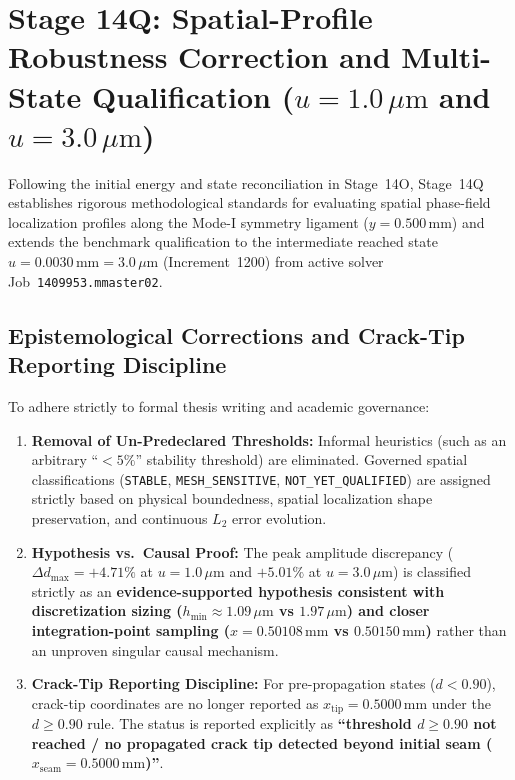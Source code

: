 \section{Stage 14Q: Spatial-Profile Robustness Correction and Multi-State Qualification (\texorpdfstring{$u = 1.0\,\mu\mathrm{m}$}{u = 1.0 um} and \texorpdfstring{$u = 3.0\,\mu\mathrm{m}$}{u = 3.0 um})}
\label{sec:stage14q_profile_robustness}

Following the initial energy and state reconciliation in Stage~14O, Stage~14Q establishes rigorous methodological standards for evaluating spatial phase-field localization profiles along the Mode-I symmetry ligament ($y = 0.500\,\mathrm{mm}$) and extends the benchmark qualification to the intermediate reached state $u = 0.0030\,\mathrm{mm} = 3.0\,\mu\mathrm{m}$ (Increment~1200) from active solver Job~\texttt{1409953.mmaster02}.

\subsection{Epistemological Corrections and Crack-Tip Reporting Discipline}
\label{subsec:stage14q_epistemology}

To adhere strictly to formal thesis writing and academic governance:
\begin{enumerate}
    \item \textbf{Removal of Un-Predeclared Thresholds:} Informal heuristics (such as an arbitrary ``$< 5\%$'' stability threshold) are eliminated. Governed spatial classifications (\texttt{STABLE}, \texttt{MESH\_SENSITIVE}, \texttt{NOT\_YET\_QUALIFIED}) are assigned strictly based on physical boundedness, spatial localization shape preservation, and continuous $L_2$ error evolution.
    \item \textbf{Hypothesis vs.\ Causal Proof:} The peak amplitude discrepancy ($\Delta d_{\max} = +4.71\%$ at $u = 1.0\,\mu\mathrm{m}$ and $+5.01\%$ at $u = 3.0\,\mu\mathrm{m}$) is classified strictly as an \textbf{evidence-supported hypothesis consistent with discretization sizing ($h_{\min} \approx 1.09\,\mu\mathrm{m}$ vs $1.97\,\mu\mathrm{m}$) and closer integration-point sampling ($x = 0.50108\,\mathrm{mm}$ vs $0.50150\,\mathrm{mm}$)} rather than an unproven singular causal mechanism.
    \item \textbf{Crack-Tip Reporting Discipline:} For pre-propagation states ($d < 0.90$), crack-tip coordinates are no longer reported as $x_{\mathrm{tip}} = 0.5000\,\mathrm{mm}$ under the $d \ge 0.90$ rule. The status is reported explicitly as \textbf{``threshold $d \ge 0.90$ not reached / no propagated crack tip detected beyond initial seam ($x_{\mathrm{seam}} = 0.5000\,\mathrm{mm}$)''}.
\end{enumerate}

